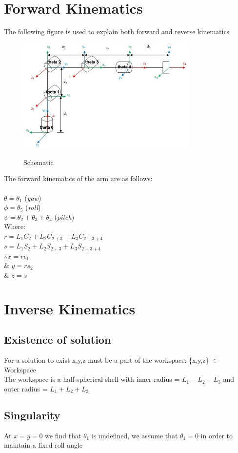 \documentclass[11pt,a4paper]{report}
\begin{document}
\section{Forward Kinematics}
The following figure is used to explain both forward and reverse kinematics\\
\begin{figure}[h]
\centering
{\includegraphics[width=0.8\textwidth]{Figures/Kine.jpg}}
\caption{Schematic \cite{picture}}
\label{fig:kine}
\end{figure}
The forward kinematics of the arm are as follows:\\\\
$\theta = \theta_1$ (\emph{yaw}) \\
$\phi = \theta_5$ (\emph{roll}) \\
$\psi = \theta_2 + \theta_3 + \theta_4 $ (\emph{pitch}) \\
Where: \\
$r = L_1C_2+L_2C_{2+3}+L_3C_{2+3+4}$ \\
$s = L_1S_2+L_2S_{2+3}+L_3S_{2+3+4}$ \\
$\therefore x=rc_1$ \\
\& $y=rs_2$ \\
\& $z=s$\\
\section{Inverse Kinematics}
\subsection{Existence of solution}
For a solution to exist x,y,z must be a part of the workspace: \{x,y,z\} $\in$ Workspace\\ 
The workspace is a half spherical shell with inner radius = $L_1-L_2-L_3$ and outer radius = $L_1+L_2+L_3$
\subsection{Singularity}
At $x=y=0$ we find that $\theta_1$ is undefined, we assume that $\theta_1=0$ in order to maintain a fixed roll angle
\end{document}
